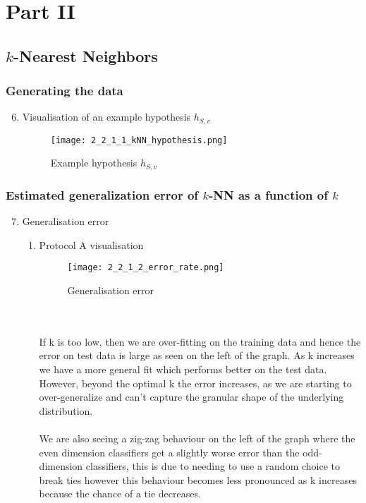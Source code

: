 \documentclass{article}
\begin{document}
\section{Part II}
    \subsection{$k$-Nearest Neighbors}
    \subsubsection{Generating the data}
    \begin{enumerate}
        \setcounter{enumi}{5}
        \item Visualisation of an example hypothesis $h_{S,v}$
        \begin{figure}[H]
            \centering
            \texttt{[image: 2\_2\_1\_1\_kNN\_hypothesis.png]}
            \caption{\label{fig:2_2_1_1_kNN_hypothesis}Example hypothesis $h_{S,v}$}
          \end{figure}
    \end{enumerate}
    \subsubsection{Estimated generalization error of $k$-NN as a function of $k$}
    \begin{enumerate}
        \setcounter{enumi}{6}
        \item Generalisation error
        \begin{enumerate}[label=\alph*.]
            \item Protocol A visualisation
            \begin{figure}[H]
                \centering
                \texttt{[image: 2\_2\_1\_2\_error\_rate.png]}
                \caption{\label{fig:2_2_1_2_error_rate}Generalisation error}
              \end{figure}
            \\\\
            If k is too low, then we are over-fitting on the training data and hence the error on test data is large as seen on the left of the graph. As k increases we have a more general fit which performs better on the test data. However, beyond the optimal k the error increases, as we are starting to over-generalize and can't capture the granular shape of the underlying distribution.
            \\\\
            We are also seeing a zig-zag behaviour on the left of the graph where the even dimension classifiers get a slightly worse error than the odd-dimension classifiers, this is due to needing to use a random choice to break ties however this behaviour becomes less pronounced as k increases because the chance of a tie decreases.
        \end{enumerate}
    \end{enumerate}
\end{document}
